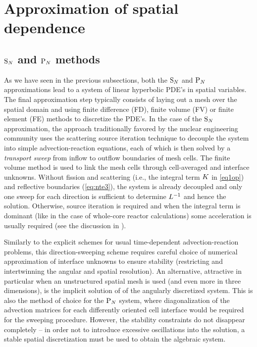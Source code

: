 \section{Approximation of spatial dependence}
\subsection{$\text{S}_{N}$ and $\text{P}_{N}$ methods}
As we have seen in the previous subsections, both the $\text{S}_{N}$ and $\text{P}_{N}$ approximations lead to a system of linear
hyperbolic PDE's in spatial variables. The final approximation step typically consists of laying out a mesh over the
spatial domain and using finite difference (FD), finite volume (FV) or finite element (FE) methods to discretize the
PDE's. In the case of the $\text{S}_{N}$ approximation, the approach traditionally favored by the nuclear engineering community
uses the scattering source iteration technique to decouple the system into simple advection-reaction equations,
each of which is then solved by a \textit{transport sweep} from inflow to outflow boundaries of mesh cells. The finite volume method is used to link
the mesh cells through cell-averaged and interface unknowns. Without fission and scattering (i.e., the integral term
$K$ in \eqref{eq1op}) and reflective boundaries (\eqref{eq:nte3}), the system is already decoupled and only one
sweep for each direction is sufficient to determine $L^{-1}$ and hence the solution. Otherwise, source
iteration is required and when the integral term is dominant (like in the case of whole-core reactor calculations) some
acceleration is usually required (see the discussion in ).

Similarly to the explicit schemes for usual time-dependent advection-reaction problems, this direction-sweeping scheme
requires careful choice of numerical approximation of interface unknowns to ensure stability (restricting and
intertwinning the angular and spatial resolution). An alternative, attractive in particular when an unstructured spatial
mesh is used (and even more in three dimensions), is the implicit solution of of the angularly discretized system. This
is also the method of choice for the $\text{P}_{N}$ system, where diagonalization of the advection matrices for each differently
oriented cell interface would be required for the sweeping procedure. However, the stability constraints do not
disappear completely -- in order not to introduce excessive oscillations into the solution, a stable spatial
discretization must be used to obtain the algebraic system. 

